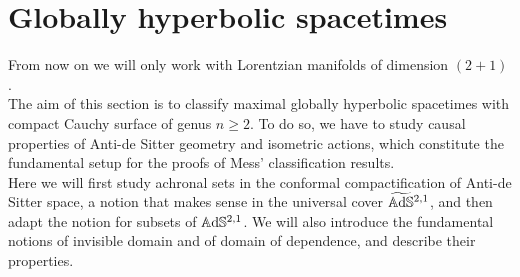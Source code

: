 \chapter{Globally hyperbolic spacetimes}\label{chapter:4}

From now on we will only work with Lorentzian manifolds of dimension $(2+1)$.\\
The aim of this section is to classify maximal globally hyperbolic spacetimes with compact Cauchy surface of genus $n\geq 2$. To do so, we have to study causal properties of Anti-de Sitter geometry and isometric actions, which constitute the fundamental setup for the proofs of Mess' classification results.\\
Here we will first study achronal sets in the conformal compactification of Anti-de Sitter space, a notion that makes sense in the universal cover $\widetilde{\mathbb{A}\mathrm{d}\mathbb{S}}{}^{2,1}$, and then adapt the notion
for subsets of $\mathbb{A}\mathrm{d}\mathbb{S}^{2,1}$. We will also introduce the fundamental notions of invisible domain and of domain of dependence, and describe their properties.

